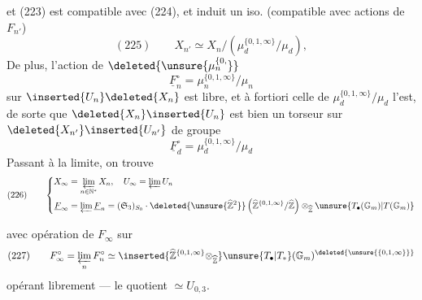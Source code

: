 et  (223) est compatible avec (224), et induit un iso. (compatible avec actions de $F_{n'}$)
\[
(225)\qquad X_{n'}\simeq X_n/(\mu_d^{\{0,1,\infty\}}/\mu_d),
\]
De plus, l'action de $\deleted{\unsure{\mu_n^{\{0,}}}$
\[
\underline F_n^{\circ}=\mu_n^{\{0,1,\infty\}}/\mu_n
\]
sur $\inserted{U_n}\deleted{X_n}$ est libre, et à fortiori celle de $\mu_d^{\{0,1,\infty\}}/\mu_d$ l'est, de sorte que $\deleted{X_n}\inserted{U_n}$ est bien un torseur sur $\deleted{X_{n'}}\inserted{U_{n'}}$ de groupe
\[
\underline F_d^{\circ}=\mu_d^{\{0,1,\infty\}}/\mu_d
\]
Passant à la limite, on trouve
\[
(226)\qquad\left\{\begin{aligned}
X_{\infty}&=\varprojlim_{n\in\mathbb N^{*}}X_n,\quad U_{\infty}=\varprojlim U_n\\
\underline F_{\infty}&=\varprojlim\underline F_n=(\mathfrak S_3)_{S_0}\mathbin{\cdot}\deleted{\unsure{\widehat{\mathbb Z}^{2}}}\left(\widehat{\mathbb Z}^{\{0,1,\infty\}}/\widehat{\mathbb Z}\right)\otimes_{\widehat{\mathbb Z}}\unsure{T_{\bullet}(\mathbb G_m)|T(\mathbb G_m)}
\end{aligned}\right.
\]



avec opération de $F_\infty$ sur 
\[
(227)\qquad F_\infty^\circ=\varprojlim_n F_n^\circ\simeq
\inserted{\widehat{\mathbb Z}^{\{0,1,\infty\}}\otimes_{\widehat{\mathbb Z}}}
\unsure{T_\bullet|T_*}(\mathbb G_m)^{\deleted{\unsure{\{0,1,\infty\}}}}
\]
opérant librement  --- le quotient 
$\simeq U_{0,3}$.

